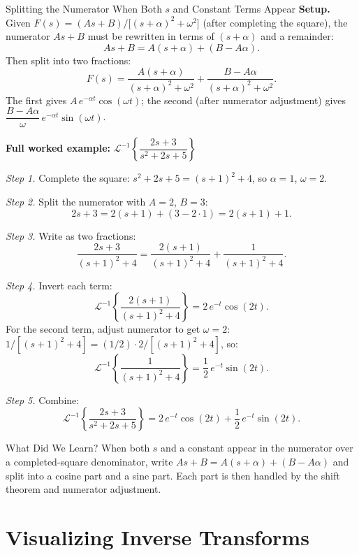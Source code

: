 \documentclass[12pt,a4paper]{article}
\begin{document}
\begin{infobox}{Splitting the Numerator When Both $s$ and Constant Terms Appear}
\textbf{Setup.} Given $F(s) = (As + B)/\bigl[(s+\alpha)^2 + \omega^2\bigr]$
(after completing the square), the numerator $As + B$ must be rewritten in terms
of $(s + \alpha)$ and a remainder:
\[
  As + B = A(s+\alpha) + (B - A\alpha).
\]
Then split into two fractions:
\[
  F(s) = \frac{A(s+\alpha)}{(s+\alpha)^2+\omega^2}
         + \frac{B - A\alpha}{(s+\alpha)^2+\omega^2}.
\]
The first gives $A\,e^{-\alpha t}\cos(\omega t)$; the second (after numerator adjustment)
gives $\dfrac{B-A\alpha}{\omega}\,e^{-\alpha t}\sin(\omega t)$.

\medskip
\textbf{Full worked example:}
$\mathcal{L}^{-1}\left\{\dfrac{2s+3}{s^2+2s+5}\right\}$

\textit{Step 1.} Complete the square: $s^2+2s+5 = (s+1)^2+4$,
so $\alpha = 1$, $\omega = 2$.

\textit{Step 2.} Split the numerator with $A = 2$, $B = 3$:
\[
  2s + 3 = 2(s+1) + (3 - 2\cdot 1) = 2(s+1) + 1.
\]

\textit{Step 3.} Write as two fractions:
\[
  \frac{2s+3}{(s+1)^2+4}
  = \frac{2(s+1)}{(s+1)^2+4} + \frac{1}{(s+1)^2+4}.
\]

\textit{Step 4.} Invert each term:
\[
  \mathcal{L}^{-1}\left\{\frac{2(s+1)}{(s+1)^2+4}\right\} = 2\,e^{-t}\cos(2t).
\]
For the second term, adjust numerator to get $\omega = 2$:
$1/[(s+1)^2+4] = (1/2)\cdot 2/[(s+1)^2+4]$, so:
\[
  \mathcal{L}^{-1}\left\{\frac{1}{(s+1)^2+4}\right\} = \frac{1}{2}\,e^{-t}\sin(2t).
\]

\textit{Step 5.} Combine:
\[
  \mathcal{L}^{-1}\left\{\frac{2s+3}{s^2+2s+5}\right\}
  = 2\,e^{-t}\cos(2t) + \frac{1}{2}\,e^{-t}\sin(2t).
\]
\end{infobox}

\begin{learnbox}{What Did We Learn?}
When both $s$ and a constant appear in the numerator over a completed-square denominator,
write $As + B = A(s+\alpha) + (B - A\alpha)$ and split into a cosine part and a sine part.
Each part is then handled by the shift theorem and numerator adjustment.
\end{learnbox}

\section{Visualizing Inverse Transforms}
\end{document}
